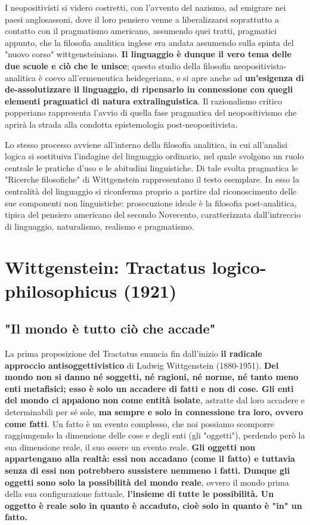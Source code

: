 I neopositivisti
si videro costretti, con l'avvento del nazismo,
ad emigrare nei paesi anglosassoni, dove il loro
pensiero venne a liberalizzarsi soprattutto
a contatto con il pragmatismo americano,
assumendo quei tratti, pragmatici appunto, che
la filosofia analitica inglese era andata
assumendo sulla spinta del "nuovo corso"
wittgensteiniano.
\textbf{Il linguaggio è dunque il vero tema delle due scuole e ciò
che le unisce}; questo studio della filosofia
neopositivista-analitica è coevo all'ermeneutica
heidegeriana, e si apre anche ad \textbf{un'esigenza
di de-assolutizzare il linguaggio, di ripensarlo
in connessione con quegli elementi pragmatici di
natura extralinguistica}. Il razionalismo critico
popperiano rappresenta l'avvio di quella fase
pragmatica del neopositivismo che aprirà la
strada alla condotta epistemologia post-neopositivista.


Lo stesso processo avviene all'interno della filosofia
analitica, in cui all'analisi logica si sostituiva
l'indagine del linguaggio ordinario, nel quale
svolgono un ruolo centrale le pratiche d'uso e le
abitudini linguistiche. Di tale svolta pragmatica
le "Ricerche filosofiche" di Wittgenstein
rappresentano il testo esemplare. In esso la
centralità del linguaggio si riconferma proprio
a partire dal riconoscimento delle sue
componenti non linguistiche: prosecuzione
ideale è la filosofia post-analitica, tipica del
pensiero americano del secondo Novecento,
caratterizzata dall'intreccio di linguaggio,
naturalismo, realismo e pragmatismo.

\section{Wittgenstein: Tractatus logico-philosophicus (1921)}

\subsection{"Il mondo è tutto ciò che accade"}

La prima proposizione del Tractatus enuncia
fin dall'inizio \textbf{il radicale approccio antisoggettivistico}
di Ludwig Wittgenstein (1880-1951). \textbf{Del
mondo non si danno né soggetti, né ragioni, né norme,
né tanto meno enti metafisici; esso è solo un accadere
di fatti e non di cose. Gli  enti del mondo ci appaiono
non come entità isolate}, astratte dal loro accadere e
determinabili per sé sole, \textbf{ma sempre e solo in connessione
tra loro, ovvero come fatti}. Un fatto è un evento
complesso, che noi possiamo scomporre raggiungendo
la dimensione delle cose e degli enti (gli "oggetti"),
perdendo però la sua dimensione reale, il suo essere
un evento reale. \textbf{Gli oggetti non appartengano
alla realtà: essi non accadano (come il fatto) e tuttavia
senza di essi non potrebbero sussistere nemmeno i
fatti. Dunque gli oggetti sono solo la possibilità
del mondo reale}, ovvero il mondo prima della sua
configurazione fattuale,\textbf{ l'insieme di tutte le
possibilità. Un oggetto è reale solo
in quanto è accaduto, cioè solo in quanto è
"in" un fatto.}


